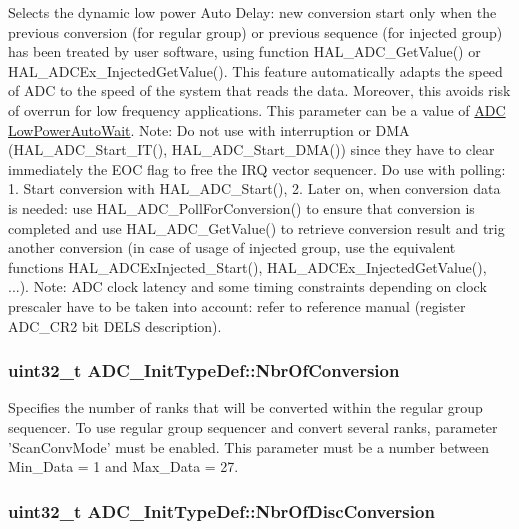 Selects the dynamic low power Auto Delay\-: new conversion start only when the previous conversion (for regular group) or previous sequence (for injected group) has been treated by user software, using function H\-A\-L\-\_\-\-A\-D\-C\-\_\-\-Get\-Value() or H\-A\-L\-\_\-\-A\-D\-C\-Ex\-\_\-\-Injected\-Get\-Value(). This feature automatically adapts the speed of A\-D\-C to the speed of the system that reads the data. Moreover, this avoids risk of overrun for low frequency applications. This parameter can be a value of \hyperlink{group___a_d_c___low_power_auto_wait}{A\-D\-C Low\-Power\-Auto\-Wait}. Note\-: Do not use with interruption or D\-M\-A (H\-A\-L\-\_\-\-A\-D\-C\-\_\-\-Start\-\_\-\-I\-T(), H\-A\-L\-\_\-\-A\-D\-C\-\_\-\-Start\-\_\-\-D\-M\-A()) since they have to clear immediately the E\-O\-C flag to free the I\-R\-Q vector sequencer. Do use with polling\-: 1. Start conversion with H\-A\-L\-\_\-\-A\-D\-C\-\_\-\-Start(), 2. Later on, when conversion data is needed\-: use H\-A\-L\-\_\-\-A\-D\-C\-\_\-\-Poll\-For\-Conversion() to ensure that conversion is completed and use H\-A\-L\-\_\-\-A\-D\-C\-\_\-\-Get\-Value() to retrieve conversion result and trig another conversion (in case of usage of injected group, use the equivalent functions H\-A\-L\-\_\-\-A\-D\-C\-Ex\-Injected\-\_\-\-Start(), H\-A\-L\-\_\-\-A\-D\-C\-Ex\-\_\-\-Injected\-Get\-Value(), ...). Note\-: A\-D\-C clock latency and some timing constraints depending on clock prescaler have to be taken into account\-: refer to reference manual (register A\-D\-C\-\_\-\-C\-R2 bit D\-E\-L\-S description). \hypertarget{struct_a_d_c___init_type_def_aa72b0cc3e8dac3a30097cf12093c42a7}{
\subsubsection[{Nbr\-Of\-Conversion}]{\setlength{\rightskip}{0pt plus 5cm}uint32\-\_\-t A\-D\-C\-\_\-\-Init\-Type\-Def\-::\-Nbr\-Of\-Conversion}}\label{struct_a_d_c___init_type_def_aa72b0cc3e8dac3a30097cf12093c42a7}
Specifies the number of ranks that will be converted within the regular group sequencer. To use regular group sequencer and convert several ranks, parameter 'Scan\-Conv\-Mode' must be enabled. This parameter must be a number between Min\-\_\-\-Data = 1 and Max\-\_\-\-Data = 27. \hypertarget{struct_a_d_c___init_type_def_a5c0078be814bfe2608ae5758826eafb8}{
\subsubsection[{Nbr\-Of\-Disc\-Conversion}]{\setlength{\rightskip}{0pt plus 5cm}uint32\-\_\-t A\-D\-C\-\_\-\-Init\-Type\-Def\-::\-Nbr\-Of\-Disc\-Conversion}}\label{struct_a_d_c___init_type_def_a5c0078be814bfe2608ae5758826eafb8}
